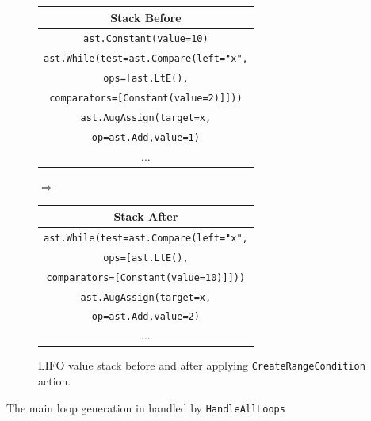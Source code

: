 \begin{figure}[H]\label{fig:extendRangeCondition-stack}
  \centering
  {\small
  \begin{tabular}{|c|}
    \hline
    \textbf{Stack Before} \\ \hline
    \texttt{\tiny{ast.}}\texttt{Constant(value=10)}\\ \hline
    \texttt{\tiny{ast.}}\texttt{While(test=}\texttt{\tiny{ast.}}\texttt{Compare(left="x",}\\
    \texttt{ops=[ast.LtE(),}\\
    \texttt{comparators=[Constant(value=2)]]))}\\ \hline
    \texttt{\tiny{ast.}}\texttt{AugAssign(target=x,}\\ 
    \texttt{op=}\texttt{\tiny{ast.}}\texttt{Add,value=1)}\\ \hline
    \(\dots\)                       \\ \hline
  \end{tabular}
  \hspace{0.25em}$\Longrightarrow$\hspace{0.25em}
  \begin{tabular}{|c|}
    \hline
    \textbf{Stack After} \\ \hline
    \texttt{\tiny{ast.}}\texttt{While(test=}\texttt{\tiny{ast.}}\texttt{Compare(left="x",}\\
    \texttt{ops=[ast.LtE(),}\\
    \texttt{comparators=[Constant(value=10)]]))}\\ \hline
    \texttt{\tiny{ast.}}\texttt{AugAssign(target=x,}\\ 
    \texttt{op=}\texttt{\tiny{ast.}}\texttt{Add,value=2)}\\ \hline
    \(\dots\)                       \\ \hline
  \end{tabular}
  }
  \caption{LIFO value stack before and after applying \texttt{CreateRangeCondition} action.}
  
\end{figure}




The main loop generation in handled by \texttt{HandleAllLoops}



